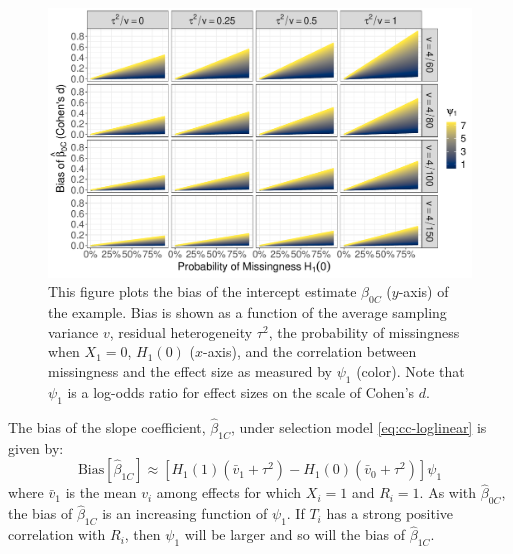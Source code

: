 \documentclass[
]{article}
\begin{document}
\begin{figure}
\begin{center}
\includegraphics[width = \textwidth]{./graphics/delta_plot_cts}
\end{center}
\caption{This figure plots the bias of the intercept estimate $\hat{\beta}_{0C}$ ($y$-axis) of the example. Bias is shown as a function of the average sampling variance $v$, residual heterogeneity $\tau^2$, the probability of missingness when $X_1 = 0$, $H_1(0)$ ($x$-axis), and the correlation between missingness and the effect size as measured by $\psi_1$ (color). Note that $\psi_1$ is a log-odds ratio for effect sizes on the scale of Cohen's $d$.}
\label{fig:delta}
\end{figure}

The bias of the slope coefficient, \(\hat{\beta}_{1C}\), under selection model \eqref{eq:cc-loglinear} is given by:
\begin{equation}
\text{Bias}[\hat{\beta}_{1C}]
  \approx \left[H_1(1)(\bar{v}_1 + \tau^2) - H_1(0)(\bar{v}_0 + \tau^2)\right]\psi_1 
\label{eq:cc-bias-beta1-example}
\end{equation}
where \(\bar{v}_1\) is the mean \(v_i\) among effects for which \(X_i = 1\) and \(R_i = 1\).
As with \(\hat{\beta}_{0C}\), the bias of \(\hat{\beta}_{1C}\) is an increasing function of \(\psi_1\).
If \(T_i\) has a strong positive correlation with \(R_i\), then \(\psi_1\) will be larger and so will the bias of \(\hat{\beta}_{1C}\).
\end{document}
